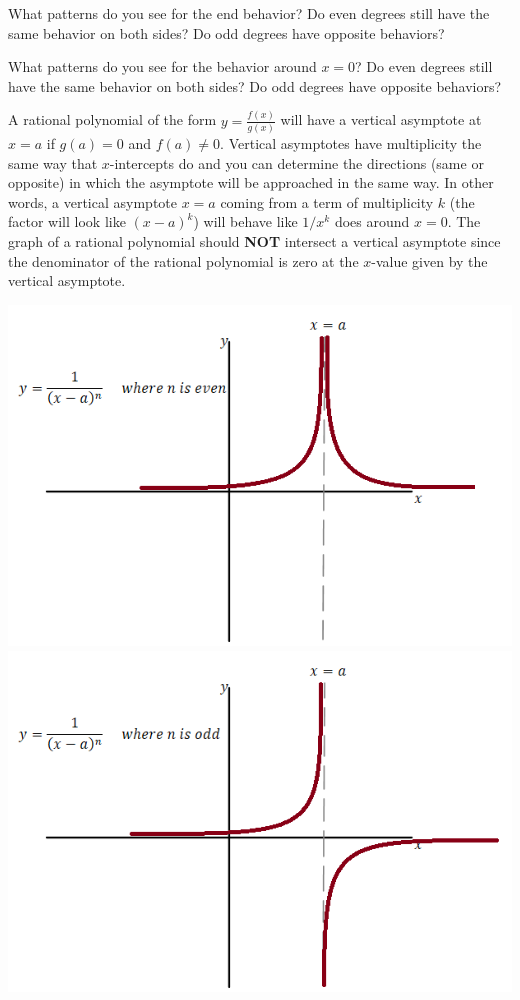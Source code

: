 \be
\item What patterns do you see for the end behavior? Do even degrees still have the same behavior on both sides? Do odd degrees have opposite behaviors?
\item What patterns do you see for the behavior around $x=0$? Do even degrees still have the same behavior on both sides? Do odd degrees have opposite behaviors?
\ee
\eq

\begin{info}
A rational polynomial of the form $y =\frac{f(x)}{g(x)}$ will have a vertical asymptote at $x=a$ if $g(a)=0$ and $f(a) \neq 0$. Vertical asymptotes have multiplicity the same way that $x$-intercepts do and you can determine the directions (same or opposite) in which the asymptote will be approached in the same way. In other words, a vertical asymptote $x=a$ coming from a term of multiplicity $k$ (the factor will look like $(x-a)^k$) will behave like $1/x^k$ does around $x=0$. The graph of a rational polynomial should \textbf{NOT} intersect a vertical asymptote since the denominator of the rational polynomial is zero at the $x$-value given by the vertical asymptote.

\begin{center} \includegraphics[scale=.5]{vaeven.png} \includegraphics[scale=.5]{vaodd.png} \end{center}
\end{info}

